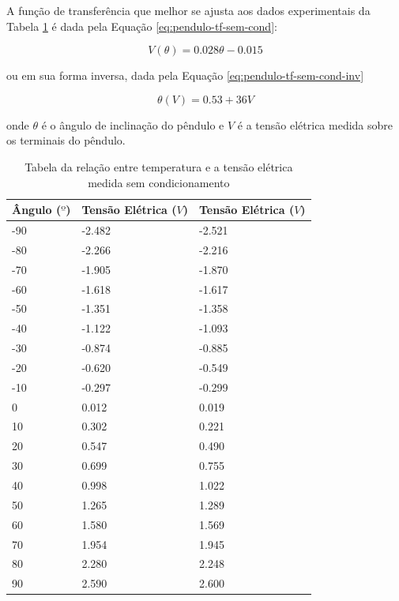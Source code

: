 \documentclass[a4paper]{instrumentacao}
\begin{document}
A função de transferência que melhor se ajusta aos dados experimentais da Tabela \ref{tab:pendulo-calibracao} é dada pela Equação \ref{eq:pendulo-tf-sem-cond}:

\begin{equation}
	V(\theta) = 0.028 \theta - 0.015
	\label{c}
\end{equation}

\noindent 
ou em sua forma inversa, dada pela Equação \ref{eq:pendulo-tf-sem-cond-inv}

\begin{equation}
	\theta(V) = 0.53 + 36 V
	\label{eq:pendulo-tf-sem-cond-inv}
\end{equation}

\noindent
onde $\theta$ é o ângulo de inclinação do pêndulo e $V$ é a tensão elétrica medida sobre os terminais do pêndulo.

\begin{table}[]
\centering
\caption{Tabela da relação entre temperatura e a tensão elétrica medida sem condicionamento}
\begin{tabular}{|l|l|l|}
 \hline
 \textbf{Ângulo ($º$)} & \textbf{Tensão Elétrica ($V$)} & \textbf{Tensão Elétrica ($V$)} \\ \hline
 
 -90 & -2.482 & -2.521 	\\ \hline
 -80 & -2.266 & -2.216 	\\ \hline
 -70 & -1.905 & -1.870	\\ \hline
 -60 & -1.618 & -1.617 	\\ \hline
 -50 & -1.351 & -1.358 	\\ \hline
 -40 & -1.122 & -1.093 	\\ \hline
 -30 & -0.874 & -0.885 	\\ \hline
 -20 & -0.620 & -0.549 	\\ \hline
 -10 & -0.297 & -0.299 	\\ \hline
 0 & 0.012 & 0.019 		\\ \hline
 10 & 0.302 & 0.221 	\\ \hline
 20 & 0.547 & 0.490 	\\ \hline
 30 & 0.699 & 0.755 	\\ \hline
 40 & 0.998 & 1.022 	\\ \hline
 50 & 1.265 & 1.289 	\\ \hline
 60 & 1.580 & 1.569 	\\ \hline
 70 & 1.954 & 1.945 	\\ \hline
 80 & 2.280 & 2.248 	\\ \hline
 90 & 2.590 & 2.600 	\\ \hline
 
\end{tabular}
\label{tab:pendulo-calibracao}
\end{table}
\end{document}
